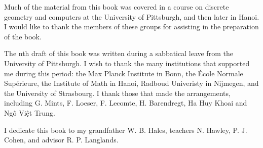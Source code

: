 Much of the material from this book was covered
in a course on discrete geometry and computers at the University of
Pittsburgh, and then later %
in Hanoi.  I would like to thank the members of these
groups for assisting in the preparation of the book.

The nth draft of this book was written during a sabbatical leave from the
University of Pittsburgh.  I wish to thank the many institutions that
supported me during this period: the Max Planck Institute in Bonn, the
\'Ecole Normale Sup\'erieure, the Institute of Math in Hanoi, Radboud
Univeristy in Nijmegen, and the University of Strasbourg.  I thank
those that made the arrangements, including G. Mints, F. Loeser,
F. Lecomte, H. Barendregt, Ha Huy Khoai and Ng\^o Vi\d{\^e}t Trung.

I dedicate this book to my grandfather W. B. Hales, teachers N. Hawley, P. J. Cohen, and
advisor R. P. Langlands.
